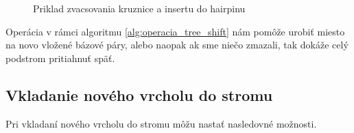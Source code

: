\begin{figure}
\begin{subfigure}{0.3\textwidth}
  \end{subfigure}

  \caption{Priklad zvacsovania kruznice a insertu do hairpinu}
  \label{obr:insert_circle_hairpin}
\end{figure}

Operácia v rámci algoritmu \ref{alg:operacia_tree_shift} nám pomôže urobiť miesto na novo vložené bázové páry,
alebo naopak ak sme niečo zmazali, tak dokáže celý podstrom pritiahnuť späť.

\subsection{Vkladanie nového vrcholu do stromu}

Pri vkladaní nového vrcholu do stromu môžu nastať nasledovné možnosti.

